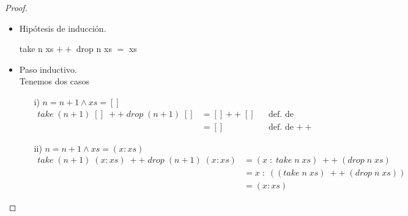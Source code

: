 \documentclass[letterpaper,11pt]{article}
\begin{document}
\begin{enumerate}
\begin{itemize}
\begin{proof}
\begin{itemize}
                \item Hipótesis de inducción.
                \begin{center}
                    take n xs $++$ drop n xs $=$ xs
                \end{center}

                \item Paso inductivo. \\ 
                Tenemos dos casos
                \begin{itemize}
                    \item[i)] $n = n + 1 \land xs = []$
                    \begin{align*}
                        take \; (n+1) \; [] \; ++ \; drop \; (n+1) \; []
                        &= [] ++ \; []
                        && \text{def. de take y drop} \\
                        &= []
                        && \text{def. de $++$} 
                    \end{align*}

                    \item[ii)] $n = n + 1 \land xs = (x:xs)$ 
                    \begin{align*}
                        take \; (n+1) \; (x:xs) \; ++ \; drop \; (n+1) \; (x:xs)
                        &= (x \; : \; take \; n \; xs) \; 
                           ++ \; (drop \; n\; xs) \\
                        &= x \; : \; ((take \; n \; xs) \; 
                        ++ \; (drop \; n \; xs)) \\ 
                        &= (x:xs)
                    \end{align*}
                \end{itemize}
            \end{itemize}    
        \end{proof}


\end{itemize}
\end{enumerate}
\end{document}
